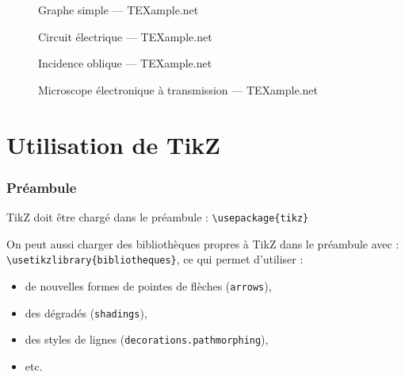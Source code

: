 \begin{frame}
  \begin{figure}
    \centering
    \tikzexc
    \caption{\footnotesize Graphe simple --- TEXample.net \cite{tikzandpgfexamples}}
  \end{figure}
\end{frame}

\begin{frame}
  \begin{figure}
    \centering
    \scalebox{0.7}{\tikzexe}
    \caption{\footnotesize Circuit électrique --- TEXample.net \cite{tikzandpgfexamples}}
  \end{figure}
\end{frame}

\begin{frame}
  \begin{figure}
    \centering
    \scalebox{0.7}{\tikzexd}
    \caption{\footnotesize Incidence oblique --- TEXample.net \cite{tikzandpgfexamples}}
  \end{figure}
\end{frame}

\begin{frame}
  \begin{figure}
    \centering
    \scalebox{0.7}{\tikzexb}
    \caption{\footnotesize Microscope électronique à transmission --- TEXample.net \cite{tikzandpgfexamples}}
  \end{figure}
\end{frame}





\section{Utilisation de TikZ}

\begin{frame}[fragile]
  \frametitle{Préambule}

TikZ doit être chargé dans le préambule :
\lstinline?\usepackage{tikz}?

\medskip
On peut aussi charger des bibliothèques propres à TikZ dans le préambule avec :
\lstinline?\usetikzlibrary{bibliotheques}?,
ce qui permet d'utiliser :
\begin{itemize}
  \item de nouvelles formes de pointes de flèches (\lstinline?arrows?),
  \item des dégradés (\lstinline?shadings?),
  \item des styles de lignes (\lstinline?decorations.pathmorphing?),
  \item etc.
\end{itemize}
\end{frame}



